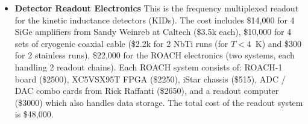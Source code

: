 \begin{itemize}
\begin{itemize}
\item 
{\bf Detector Readout Electronics}
This is the frequency multiplexed readout for the kinetic inductance detectors (KIDs).  The cost includes \$14,000 for 4 SiGe amplifiers from Sandy Weinreb at Caltech (\$3.5k each), \$10,000 for 4 sets of cryogenic coaxial cable (\$2.2k for 2 NbTi runs (for $T<4$~K) and \$300 for 2 stainless runs), \$22,000 for the ROACH  electronics (two systems, each handling 2 readout chains).  Each ROACH system consists of: ROACH-1 board (\$2500), XC5VSX95T FPGA (\$2250), iStar chassis (\$515), ADC / DAC combo cards from Rick Raffanti (\$2650), and a readout computer (\$3000) which also handles data storage.  The total cost of the readout system is \$48,000.

% 



\end{itemize}

\end{itemize}
